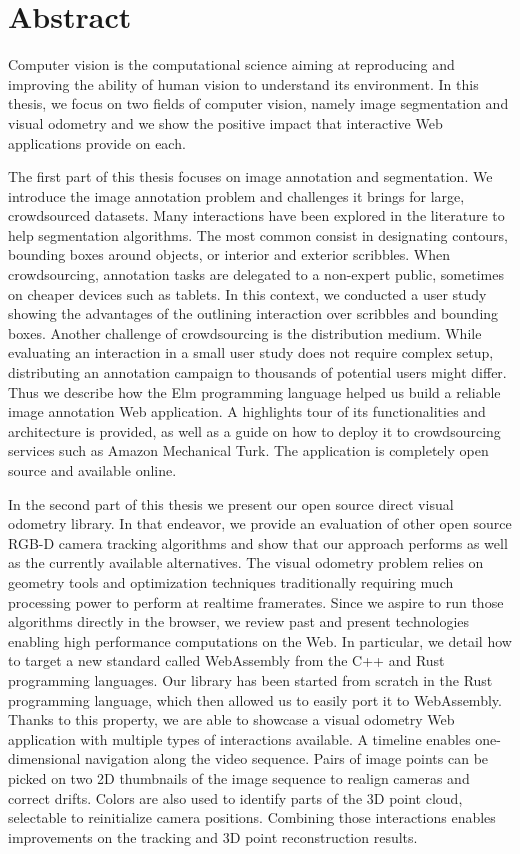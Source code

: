 \section*{Abstract}%
\label{sec:Abstract}

Computer vision is the computational science aiming at reproducing and improving
the ability of human vision to understand its environment.
In this thesis, we focus on two fields of computer vision, namely image segmentation
and visual odometry and
we show the positive impact that interactive Web applications provide on each.

The first part of this thesis focuses on image annotation and segmentation.
We introduce the image annotation problem
and challenges it brings for large, crowdsourced datasets.
Many interactions have been explored in the literature to help segmentation algorithms.
The most common consist in designating contours,
bounding boxes around objects,
or interior and exterior scribbles.
When crowdsourcing, annotation tasks are delegated
to a non-expert public, sometimes on cheaper devices such as tablets.
In this context, we conducted a user study showing
the advantages of the outlining interaction over scribbles and bounding boxes.
Another challenge of crowdsourcing is the distribution medium.
While evaluating an interaction in a small user study does not require complex setup,
distributing an annotation campaign to thousands of potential users might differ.
Thus we describe how the Elm programming language helped us
build a reliable image annotation Web application.
A highlights tour of its functionalities and architecture is provided,
as well as a guide on how to deploy it to crowdsourcing services
such as Amazon Mechanical Turk.
The application is completely open source and available online.

In the second part of this thesis we present our open source
direct visual odometry library.
In that endeavor, we provide an evaluation of other open source
RGB-D camera tracking algorithms and show that our approach
performs as well as the currently available alternatives.
The visual odometry problem relies on geometry tools and optimization techniques
traditionally requiring much processing power to perform at realtime framerates.
Since we aspire to run those algorithms directly in the browser,
we review past and present technologies
enabling high performance computations on the Web.
In particular, we detail how to target a new standard called WebAssembly from
the C++ and Rust programming languages.
Our library has been started from scratch in the Rust programming language,
which then allowed us to easily port it to WebAssembly.
Thanks to this property, we are able to showcase
a visual odometry Web application with multiple types of interactions available.
A timeline enables one-dimensional navigation along the video sequence.
Pairs of image points can be picked on two 2D thumbnails
of the image sequence to realign cameras and correct drifts.
Colors are also used to identify parts of the 3D point cloud,
selectable to reinitialize camera positions.
Combining those interactions enables improvements
on the tracking and 3D point reconstruction results.
